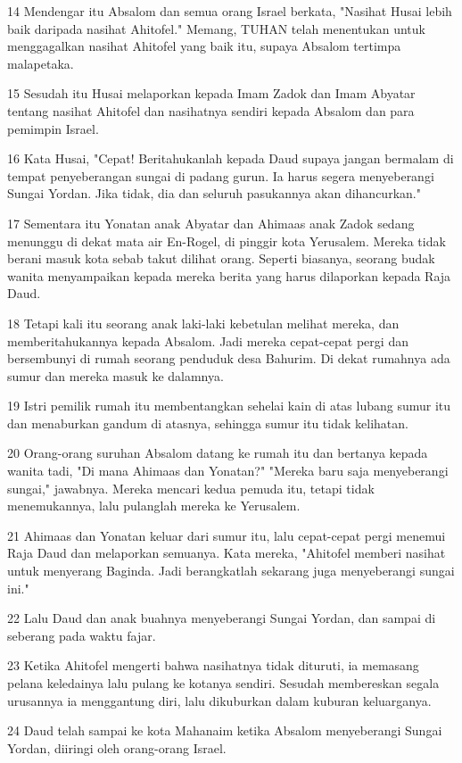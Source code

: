 \par 14 Mendengar itu Absalom dan semua orang Israel berkata, "Nasihat Husai lebih baik daripada nasihat Ahitofel." Memang, TUHAN telah menentukan untuk menggagalkan nasihat Ahitofel yang baik itu, supaya Absalom tertimpa malapetaka.
\par 15 Sesudah itu Husai melaporkan kepada Imam Zadok dan Imam Abyatar tentang nasihat Ahitofel dan nasihatnya sendiri kepada Absalom dan para pemimpin Israel.
\par 16 Kata Husai, "Cepat! Beritahukanlah kepada Daud supaya jangan bermalam di tempat penyeberangan sungai di padang gurun. Ia harus segera menyeberangi Sungai Yordan. Jika tidak, dia dan seluruh pasukannya akan dihancurkan."
\par 17 Sementara itu Yonatan anak Abyatar dan Ahimaas anak Zadok sedang menunggu di dekat mata air En-Rogel, di pinggir kota Yerusalem. Mereka tidak berani masuk kota sebab takut dilihat orang. Seperti biasanya, seorang budak wanita menyampaikan kepada mereka berita yang harus dilaporkan kepada Raja Daud.
\par 18 Tetapi kali itu seorang anak laki-laki kebetulan melihat mereka, dan memberitahukannya kepada Absalom. Jadi mereka cepat-cepat pergi dan bersembunyi di rumah seorang penduduk desa Bahurim. Di dekat rumahnya ada sumur dan mereka masuk ke dalamnya.
\par 19 Istri pemilik rumah itu membentangkan sehelai kain di atas lubang sumur itu dan menaburkan gandum di atasnya, sehingga sumur itu tidak kelihatan.
\par 20 Orang-orang suruhan Absalom datang ke rumah itu dan bertanya kepada wanita tadi, "Di mana Ahimaas dan Yonatan?" "Mereka baru saja menyeberangi sungai," jawabnya. Mereka mencari kedua pemuda itu, tetapi tidak menemukannya, lalu pulanglah mereka ke Yerusalem.
\par 21 Ahimaas dan Yonatan keluar dari sumur itu, lalu cepat-cepat pergi menemui Raja Daud dan melaporkan semuanya. Kata mereka, "Ahitofel memberi nasihat untuk menyerang Baginda. Jadi berangkatlah sekarang juga menyeberangi sungai ini."
\par 22 Lalu Daud dan anak buahnya menyeberangi Sungai Yordan, dan sampai di seberang pada waktu fajar.
\par 23 Ketika Ahitofel mengerti bahwa nasihatnya tidak dituruti, ia memasang pelana keledainya lalu pulang ke kotanya sendiri. Sesudah membereskan segala urusannya ia menggantung diri, lalu dikuburkan dalam kuburan keluarganya.
\par 24 Daud telah sampai ke kota Mahanaim ketika Absalom menyeberangi Sungai Yordan, diiringi oleh orang-orang Israel.

